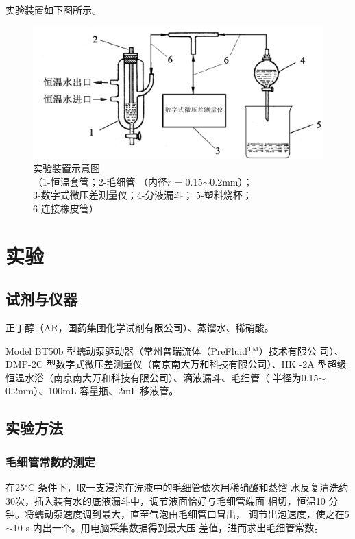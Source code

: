 \documentclass[12pt]{ctexart}
\numberwithin{equation}{section}
\begin{document}
实验装置如下图所示。
\begin{figure}[!h]
    \centering
    \includegraphics[scale=0.15]{shiyanzhuangzhi.png}
    \caption{实验装置示意图\protect\\
             \kaishu（1-恒温套管；2-毛细管
             （内径$r$ = 0.15$\sim$0.2mm）；
             \protect\\3-数字式微压差测量仪；4-分液漏斗；
             5-塑料烧杯；\protect\\6-连接橡皮管）}
\end{figure}

\section{实验}
\subsection{试剂与仪器}

正丁醇（AR，国药集团化学试剂有限公司）、蒸馏水、稀硝酸。

Model BT50b 型蠕动泵驱动器（常州普瑞流体（PreFluid$^{\text{TM}}$）技术有限公
司）、DMP-2C 型数字式微压差测量仪（南京南大万和科技有限公司）、HK
-2A 型超级恒温水浴（南京南大万和科技有限公司）、滴液漏斗、毛细管（
半径为0.15$\sim$0.2mm）、100mL 容量瓶、2mL 移液管。

\subsection{实验方法}
\subsubsection{毛细管常数的测定}

在25$^\circ$C 条件下，取一支浸泡在洗液中的毛细管依次用稀硝酸和蒸馏
水反复清洗约30次，插入装有水的底液漏斗中，调节液面恰好与毛细管端面
相切，恒温10 分钟。将蠕动泵速度调到最大，直至气泡由毛细管口冒出，
调节出泡速度，使之在5$\sim$10 s 内出一个。用电脑采集数据得到最大压
差值，进而求出毛细管常数。
\end{document}
